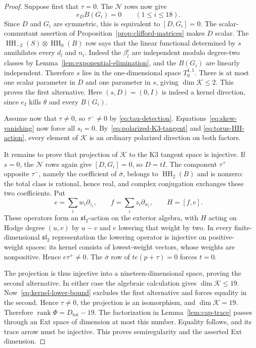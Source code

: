 \documentclass[11pt]{article}
\numberwithin{equation}{section}
\theoremstyle{definition}
\theoremstyle{remark}
\begin{document}
\begin{proof}
Suppose first that $\tau=0$. The $\mathcal N$ rows now give
\[
 e_DB(G_i)=0\qquad(1\le i\le18).
\]
Since $D$ and $G_i$ are symmetric, this is equivalent to
$[D,G_i]=0$. The scalar-commutant assertion of
Proposition~\ref{prop:clifford-matrices} makes $D$ scalar.
The $\operatorname{HH}_{-2}(S)\otimes\operatorname{HH}_0(B)$ row says that the linear
functional determined by $s$ annihilates every $d_l$ and $n_i$.
Indeed the $\beta_l^\epsilon$ are independent modulo degree-two
classes by Lemma~\ref{lem:exponential-elimination}, and the
$B(G_i)$ are linearly independent. Therefore $s$ lies in the
one-dimensional space $T_0^{1,1}$. There is at most one scalar
parameter in $D$ and one parameter in $s$, giving $\dim \mathcal K\le2$.
This proves the first alternative. Here $(s,D)=(0,I)$ is indeed
a kernel direction, since $e_I$ kills $\theta$ and every $B(G_i)$.

Assume now that $\tau\ne0$, so $\tau^-\ne0$ by
\eqref{eq:tau-detection}. Equations~\eqref{eq:skew-vanishing}
now force all $s_l=0$. By~\eqref{eq:polarized-K3-tangent} and
\eqref{eq:torus-HH-action}, every element of $\mathcal K$ is an ordinary
polarized direction on both factors.

It remains to prove that projection of $\mathcal K$ to the K3 tangent space
is injective. If $s=0$, the $\mathcal N$ rows again give
$[D,G_i]=0$, so $D=tI$. The component $\tau^+$ opposite $\tau^-$,
namely the coefficient of $\bar\sigma$, belongs to $\operatorname{HH}_2(B)$
and is nonzero: the total class is rational, hence real, and
complex conjugation exchanges these two coefficients. Put
\[
 e=\sum_iw_i\partial_{z_i},\qquad
 f=\sum_iz_i\partial_{w_i},\qquad H=[f,e].
\]
These operators form an $\mathfrak{sl}_2$-action on the exterior
algebra, with $H$ acting on Hodge degree $(u,v)$ by $u-v$ and $e$
lowering that weight by two. In every finite-dimensional
$\mathfrak{sl}_2$ representation the lowering operator is injective
on positive-weight spaces: its kernel consists of lowest-weight
vectors, whose weights are nonpositive. Hence $e\tau^+\ne0$.
The $\bar\sigma$ row of $t e(p+\tau)=0$ forces $t=0$.

The projection is thus injective into a nineteen-dimensional
space, proving the second alternative. In either case the
algebraic calculation gives $\dim\mathcal K\le19$.
Now~\eqref{eq:kernel-lower-bound} excludes the first alternative
and forces equality in the second. Hence $\tau\ne0$, the
projection is an isomorphism, and $\dim\mathcal K=19$. Therefore
$\operatorname{rank}\Phi=D_{\mathrm{tot}}-19$.
The factorization in Lemma~\ref{lem:cap-trace} passes through an
Ext space of dimension at most this number. Equality follows,
and its trace arrow must be injective. This proves semiregularity
and the asserted Ext dimension.
\end{proof}
\end{document}
